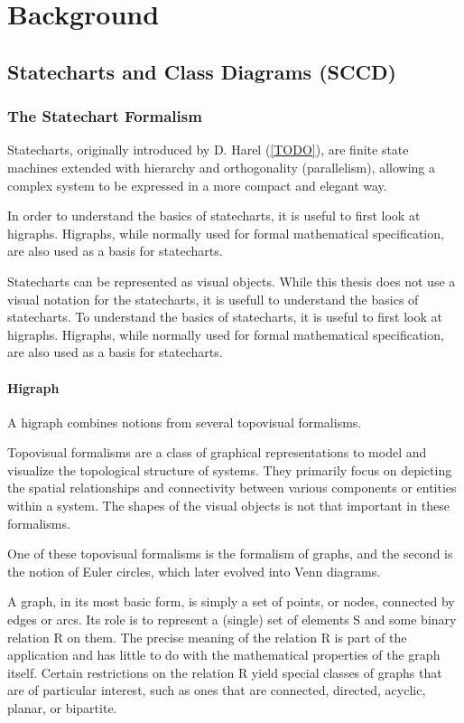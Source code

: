 \chapter{Background}
\label{chapt:Background}

\section{Statecharts and Class Diagrams (SCCD)}
\subsection{The Statechart Formalism}
Statecharts, originally introduced by D. Harel (\ref{TODO}), are finite state machines extended with hierarchy and 
orthogonality (parallelism), allowing a complex system to be expressed in a more compact and elegant way.

In order to understand the basics of statecharts, it is useful to first look at higraphs. Higraphs, while normally used 
for formal mathematical specification, are also used as a basis for statecharts.

Statecharts can be represented as visual objects. While this thesis does not use a visual notation for the statecharts, 
it is usefull to understand the basics of statecharts. To understand the basics of statecharts, it is useful to first 
look at higraphs. Higraphs, while normally used for formal mathematical specification, are also used as a basis for 
statecharts. 

\subsubsection{Higraph}
A higraph combines notions from several topovisual formalisms.

Topovisual formalisms are a class of graphical representations to model and visualize the topological structure of systems. 
They primarily focus on depicting the spatial relationships and connectivity between various components or entities within 
a system. The shapes of the visual objects is not that important in these formalisms.

One of these topovisual formalisms is the formalism of graphs, and the second is the notion of Euler circles, which later 
evolved into Venn diagrams.

A graph, in its most basic form, is simply a set of points, or nodes, connected by edges or arcs. Its role is to represent 
a (single) set of elements S and some binary relation R on them. The precise meaning of the relation R is part of the 
application and has little to do with the mathematical properties of the graph itself. Certain restrictions on the relation 
R yield special classes of graphs that are of particular interest, such as ones that are connected, directed, acyclic, 
planar, or bipartite.

